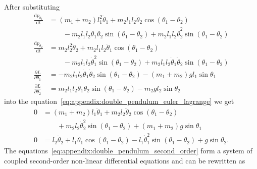 After substituting
  \begin{equation}
    \begin{aligned}
      \frac{\mathrm{d} p_{\theta_1}}{\mathrm{d}
      t}                          & = (m_1 + m_2)l_1^2 \ddot{\theta}_1 + m_2 l_1 l_2 \ddot{\theta}_2 \cos(\theta_1 -
      \theta_2)                                                                                                      \\  & \qquad - m_2 l_1 l_2 \dot{\theta}_1 \dot{\theta}_2 \sin(\theta_1 - \theta_2) +
      m_2 l_1 l_2 \dot{\theta}_2^2 \sin(\theta_1 - \theta_2)                                                         \\ \frac{\mathrm{d}
      p_{\theta_2}}{\mathrm{d} t} & = m_2 l_2^2 \ddot{\theta}_2 + m_2 l_1 l_2
      \ddot{\theta}_1\cos(\theta_1 - \theta_2)                                                                       \\  & \qquad - m_2 l_1 l_2
         \dot{\theta}_1^2\sin(\theta_1 - \theta_2) + m_2 l_1 l_2 \dot{\theta}_1
      \dot{\theta}_2\sin(\theta_1 - \theta_2)                                                                        \\ \frac{\partial L}{\partial \theta_1} & = -m_2 l_1
         l_2 \dot{\theta}_1 \dot{\theta}_2 \sin(\theta_1 - \theta_2) - (m_1 + m_2) g l_1 \sin\theta_1
      \\ \frac{\partial L}{\partial \theta_2} & = m_2 l_1 l_2 \dot{\theta}_1 \dot{\theta}_2
         \sin(\theta_1 - \theta_2) - m_2 g l_2 \sin\theta_2
    \end{aligned}
  \end{equation}
  into the
  equation~\eqref{eq:appendix:double_pendulum_euler_lagrange} we get
  \begin{equation}\label{eq:appendix:double_pendulum_second_order} \begin{aligned} 0 & = (m_1 +
  m_2)l_1 \ddot{\theta}_1 + m_2 l_2 \ddot{\theta}_2 \cos(\theta_1 - \theta_2) \\ & \qquad + m_2
  l_2 \dot{\theta}_2^2\sin(\theta_1 - \theta_2) + (m_1 + m_2) g \sin\theta_1 \\ 0 & = l_2
  \ddot{\theta}_2 + l_1 \ddot{\theta}_1 \cos(\theta_1 - \theta_2) - l_1 \dot{\theta}_1^2
  \sin(\theta_1 - \theta_2) + g \sin \theta_2.
\end{aligned}
\end{equation}
The equations~\eqref{eq:appendix:double_pendulum_second_order} form a system of coupled
  second-order non-linear differential equations and can be rewritten as
